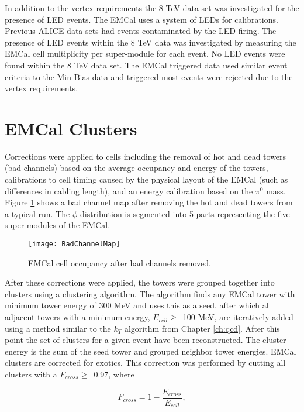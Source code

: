  In addition to the vertex requirements the 8 TeV data set was investigated for the presence of LED events.  The EMCal uses a system of LEDs for calibrations.  Previous ALICE data sets had events contaminated by the LED firing.  The presence of LED events within the 8 TeV data was investigated by measuring the EMCal cell multiplicity per super-module for each event.  No LED events were found within the 8 TeV data set.
The EMCal triggered data used similar event criteria to the Min Bias data and  triggered most events were rejected due to the vertex requirements.


\section{EMCal Clusters}


Corrections were applied to cells including the removal of hot and dead towers (bad channels) based on the average occupancy and energy of the towers, calibrations to cell timing caused by the physical layout of the EMCal (such as differences in cabling length), and an energy calibration based on the $\pi^{0}$ mass.   Figure \ref{fig:badchannel} shows a bad channel map after removing the hot and dead towers from a typical run.  The $\phi$ distribution is segmented into 5 parts representing the five super modules of the EMCal.  

\begin{figure}[h]
\texttt{[image: BadChannelMap]}
\centering
\caption{EMCal cell occupancy after bad channels removed.}
\label{fig:badchannel}
\end{figure}

After these corrections were applied, the towers were grouped together into clusters using a clustering algorithm.  The algorithm finds any EMCal tower with minimum tower energy of 300 MeV and uses this as a seed, after which all adjacent towers with a minimum energy, $E_{cell} \geq \,$ 100 MeV, are iteratively added using a method similar to the $k_{T}$ algorithm from Chapter \ref{ch:qcd}.  After this point the set of clusters for a given event have been reconstructed.  The cluster energy is the sum of the seed tower and grouped neighbor tower energies.  EMCal clusters are corrected for exotics.  This correction was performed by cutting all clusters with a $F_{cross} \geq \,$ 0.97, where

\begin{equation}
F_{cross} = 1 - \frac{ E_{cross} }{ E_{cell} },
\label{eq:Fcross}
\end{equation}

